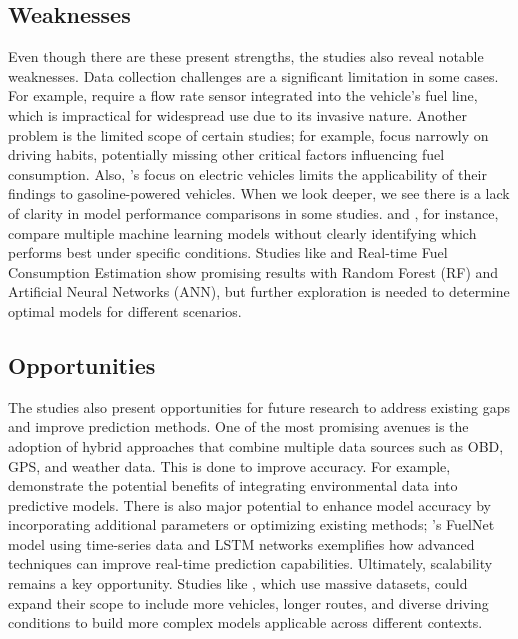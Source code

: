 \documentclass[letterpaper]{article}
\begin{document}
\subsection*{Weaknesses}

Even though there are these present strengths, the studies also reveal notable weaknesses. 
Data collection challenges are a significant limitation in some cases. For example, 
\cite{al2007experimental} require a flow rate sensor integrated into the vehicle's fuel line, 
which is impractical for widespread use due to its invasive nature. Another problem is the 
limited scope of certain studies; for example, \cite{Manjunath2024} focus narrowly on driving 
habits, potentially missing other critical factors influencing fuel consumption. Also, 
\cite{filla2025using}'s focus on electric vehicles limits the applicability of their findings 
to gasoline-powered vehicles. When we look deeper, we see there is a lack of clarity in model
performance comparisons in some studies. \cite{yang2022predicting} and \cite{zhang2023novel}, 
for instance, compare multiple machine learning models without clearly identifying which 
performs best under specific conditions. Studies like \cite{abukhalil2020fuel} and Real-time 
Fuel Consumption Estimation show promising results with Random Forest (RF) and Artificial 
Neural Networks (ANN), but further exploration is needed to determine optimal models for 
different scenarios.


\subsection*{Opportunities}

The studies also present opportunities for future research to address existing gaps and improve 
prediction methods. One of the most promising avenues is the adoption of hybrid approaches that 
combine multiple data sources such as OBD, GPS, and weather data. This is done to improve 
accuracy. For example, \cite{filla2025using} demonstrate the potential benefits of integrating 
environmental data into predictive models. There is also major potential to enhance model 
accuracy by incorporating additional parameters or optimizing existing methods; 
\cite{wang2020fuelnet}'s  FuelNet model using time-series data and LSTM networks exemplifies 
how advanced techniques can improve real-time prediction capabilities. Ultimately, scalability 
remains a key opportunity. Studies like \cite{yang2022predicting}, which use massive datasets, 
could expand their scope to include more vehicles, longer routes, and diverse driving conditions 
to build more complex models applicable across different contexts.
\end{document}
